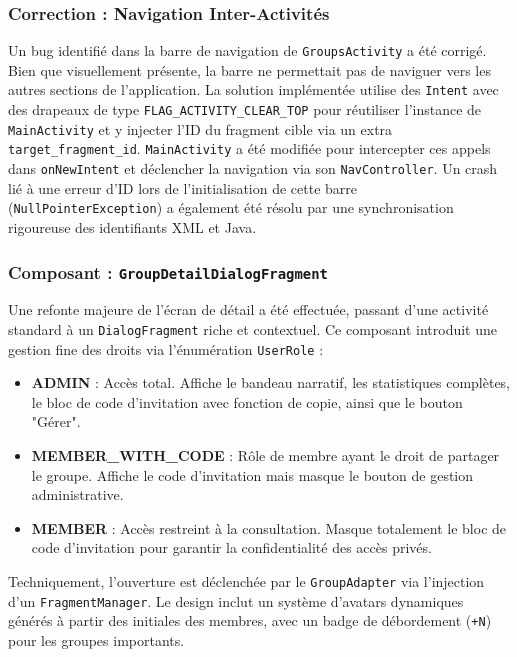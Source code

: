 \documentclass{article}
\begin{document}
\subsubsection{Correction : Navigation Inter-Activités}
Un bug identifié dans la barre de navigation de \texttt{GroupsActivity} a été corrigé. Bien que visuellement présente, la barre ne permettait pas de naviguer vers les autres sections de l'application. La solution implémentée utilise des \texttt{Intent} avec des drapeaux de type \texttt{FLAG\_ACTIVITY\_CLEAR\_TOP} pour réutiliser l'instance de \texttt{MainActivity} et y injecter l'ID du fragment cible via un extra \texttt{target\_fragment\_id}. \texttt{MainActivity} a été modifiée pour intercepter ces appels dans \texttt{onNewIntent} et déclencher la navigation via son \texttt{NavController}. Un crash lié à une erreur d'ID lors de l'initialisation de cette barre (\texttt{NullPointerException}) a également été résolu par une synchronisation rigoureuse des identifiants XML et Java.

\subsubsection{Composant : \texttt{GroupDetailDialogFragment}}
Une refonte majeure de l'écran de détail a été effectuée, passant d'une activité standard à un \texttt{DialogFragment} riche et contextuel. Ce composant introduit une gestion fine des droits via l'énumération \texttt{UserRole} :
\begin{itemize}
    \item \textbf{ADMIN} : Accès total. Affiche le bandeau narratif, les statistiques complètes, le bloc de code d'invitation avec fonction de copie, ainsi que le bouton "Gérer".
    \item \textbf{MEMBER\_WITH\_CODE} : Rôle de membre ayant le droit de partager le groupe. Affiche le code d'invitation mais masque le bouton de gestion administrative.
    \item \textbf{MEMBER} : Accès restreint à la consultation. Masque totalement le bloc de code d'invitation pour garantir la confidentialité des accès privés.
\end{itemize}
Techniquement, l'ouverture est déclenchée par le \texttt{GroupAdapter} via l'injection d'un \texttt{FragmentManager}. Le design inclut un système d'avatars dynamiques générés à partir des initiales des membres, avec un badge de débordement (\texttt{+N}) pour les groupes importants.
\end{document}
